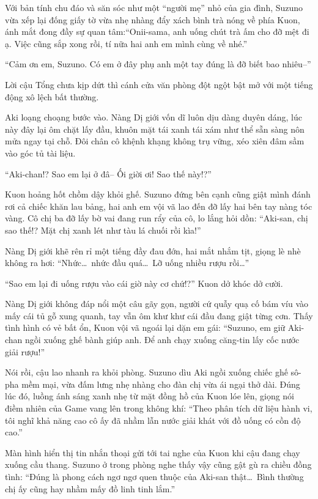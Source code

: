 \documentclass[../main.tex]{subfiles}
\begin{document}
\chrint

Với bản tính chu đáo và săn sóc như một ``người mẹ'' nhỏ của gia đình, Suzuno vừa xếp lại đống giấy tờ vừa nhẹ nhàng đẩy xách bình trà nóng về phía Kuon, ánh mắt đong đầy sự quan tâm:``Onii-sama, anh uống chút trà ấm cho đỡ mệt đi ạ. Việc cũng sắp xong rồi, tí nữa hai anh em mình cùng về nhé.''

``Cảm ơn em, Suzuno. Có em ở đây phụ anh một tay đúng là đỡ biết bao nhiêu--''

Lời cậu Tổng chưa kịp dứt thì cánh cửa văn phòng đột ngột bật mở với một tiếng động xô lệch bất thường.

Aki loạng choạng bước vào. Nàng Dị giới vốn dĩ luôn dịu dàng duyên dáng, lúc này đây lại ôm chặt lấy đầu, khuôn mặt tái xanh tái xám như thể sẵn sàng nôn mửa ngay tại chỗ. Đôi chân cô khệnh khạng không trụ vững, xéo xiên đâm sầm vào góc tủ tài liệu.


``Aki-chan!? Sao em lại ở đâ-- Ối giời ơi! Sao thế này!?''

Kuon hoảng hốt chồm dậy khỏi ghế. Suzuno đứng bên cạnh cũng giật mình đánh rơi cả chiếc khăn lau bảng, hai anh em vội vã lao đến đỡ lấy hai bên tay nàng tóc vàng. Cô chị ba đỡ lấy bờ vai đang run rẩy của cô, lo lắng hỏi dồn: ``Aki-san, chị sao thế!? Mặt chị xanh lét như tàu lá chuối rồi kìa!''

Nàng Dị giới khẽ rên rỉ một tiếng đầy đau đớn, hai mắt nhắm tịt, giọng lè nhè không ra hơi: ``Nhức\dots\ nhức đầu quá\dots\ Lỡ uống nhiều rượu rồi\dots''

``Sao em lại đi uống rượu vào cái giờ này cơ chứ!?'' Kuon dở khóc dở cười.

Nàng Dị giới không đáp nổi một câu gãy gọn, người cứ quẫy quạ cố bám víu vào mấy cái tủ gỗ xung quanh, tay vẫn ôm khư khư cái đầu đang giật từng cơn. Thấy tình hình có vẻ bất ổn, Kuon vội vã ngoái lại dặn em gái: ``Suzuno, em giữ Aki-chan ngồi xuống ghế bành giúp anh. Để anh chạy xuống căng-tin lấy cốc nước giải rượu!''

Nói rồi, cậu lao nhanh ra khỏi phòng. Suzuno dìu Aki ngồi xuống chiếc ghế sô-pha mềm mại, vừa đấm lưng nhẹ nhàng cho đàn chị vừa ái ngại thở dài. Đúng lúc đó, luồng ánh sáng xanh nhẹ từ mặt đồng hồ của Kuon lóe lên, giọng nói điềm nhiên của Game vang lên trong không khí: ``Theo phân tích dữ liệu hành vi, tôi nghĩ khả năng cao cô ấy đã nhầm lẫn nước giải khát với đồ uống có cồn độ cao.''

Màn hình hiển thị tin nhắn thoại gửi tới tai nghe của Kuon khi cậu đang chạy xuống cầu thang. Suzuno ở trong phòng nghe thấy vậy cũng gật gù ra chiều đồng tình: ``Đúng là phong cách ngơ ngơ quen thuộc của Aki-san thật\dots\ Bình thường chị ấy cũng hay nhầm mấy đồ linh tinh lắm.''
\end{document}
